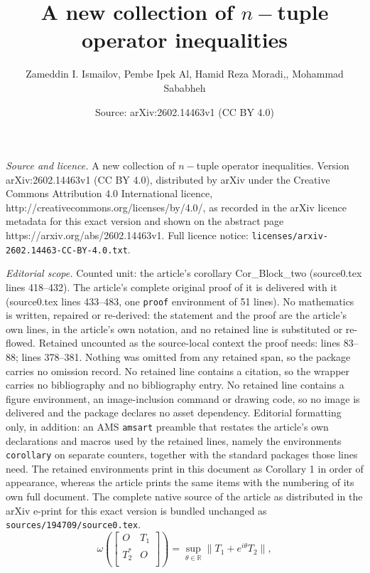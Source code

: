 \documentclass[10pt,a4paper]{amsart}
\title{A new collection of $n-$tuple operator inequalities}
\author{Zameddin I. Ismailov, Pembe Ipek Al, Hamid Reza Moradi,, Mohammad Sababheh}
\date{Source: arXiv:2602.14463v1 (CC BY 4.0)}
\begin{document}
\maketitle

\noindent\emph{Source and licence.} A new collection of $n-$tuple operator inequalities. Version arXiv:2602.14463v1 (CC BY 4.0), distributed by arXiv under the Creative Commons Attribution 4.0 International licence, http://creativecommons.org/licenses/by/4.0/, as recorded in the arXiv licence metadata for this exact version and shown on the abstract page https://arxiv.org/abs/2602.14463v1. Full licence notice: \texttt{licenses/arxiv-2602.14463-CC-BY-4.0.txt}.\par\smallskip

\noindent\textit{Editorial scope.} Counted unit: the article's corollary Cor\_Block\_two (source0.tex lines 418--432). The article's complete original proof of it is delivered with it (source0.tex lines 433--483, one \texttt{proof} environment of 51 lines). No mathematics is written, repaired or re-derived: the statement and the proof are the article's own lines, in the article's own notation, and no retained line is substituted or re-flowed.  Retained uncounted as the source-local context the proof needs: lines 83--88; lines 378--381.  Nothing was omitted from any retained span, so the package carries no omission record.  No retained line contains a citation, so the wrapper carries no bibliography and no bibliography entry.  No retained line contains a figure environment, an image-inclusion command or drawing code, so no image is delivered and the package declares no asset dependency.  Editorial formatting only, in addition: an AMS \texttt{amsart} preamble that restates the article's own declarations and macros used by the retained lines, namely the environments \texttt{corollary} on separate counters, together with the standard packages those lines need.  The retained environments print in this document as Corollary 1 in order of appearance, whereas the article prints the same items with the numbering of its own full document.  The complete native source of the article as distributed in the arXiv e-print for this exact version is bundled unchanged as \texttt{sources/194709/source0.tex}.
\begin{equation}\label{Eq_Ident_Bl}
\omega \left( \left[ \begin{matrix}
   O & {{T}_{1}}  \\
   T_{2}^{*} & O  \\
\end{matrix} \right] \right)=\sup_{\theta\in\mathbb{R}}\|T_1+e^{i\theta}T_2\|,
\end{equation}
\end{document}

